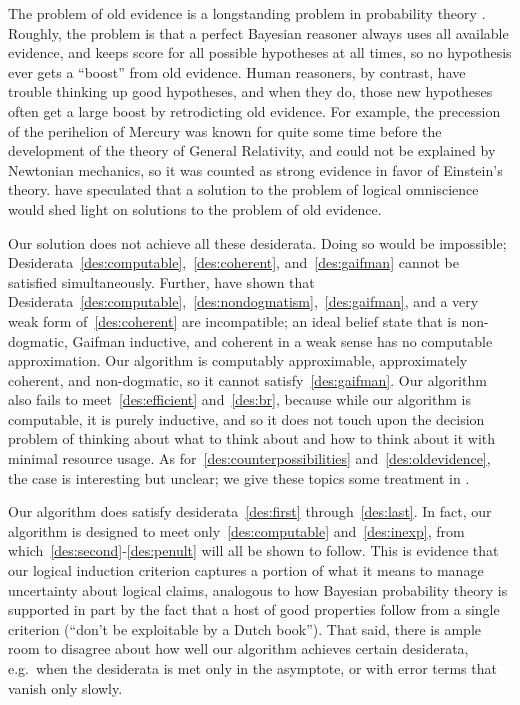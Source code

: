 \documentclass[authordate,onecolumn,noenvironments]{miri-tech-article}
\numberwithin{equation}{subsection}
\begin{document}
\noindent The problem of old evidence is a longstanding problem in probability theory \citep{Glymour:1980:OldEvidence}. Roughly, the problem is that a perfect Bayesian reasoner always uses all available evidence, and keeps score for all possible hypotheses at all times, so no hypothesis ever gets a ``boost'' from old evidence. Human reasoners, by contrast, have trouble thinking up good hypotheses, and when they do, those new hypotheses often get a large boost by retrodicting old evidence. For example, the precession of the perihelion of Mercury was known for quite some time before the development of the theory of General Relativity, and could not be explained by Newtonian mechanics, so it was counted as strong evidence in favor of Einstein's theory. \citet{Garber:1983:OldEvidence,Jeffrey:1983:OldEvidence} have speculated that a solution to the problem of logical omniscience would shed light on solutions to the problem of old evidence.\par\bigskip

\noindent Our solution does not achieve all these desiderata. Doing so would be impossible; Desiderata~\ref{des:computable},~\ref{des:coherent}, and~\ref{des:gaifman} cannot be satisfied simultaneously. Further, \citet{Sawin:2013:pi1pi2} have shown that Desiderata~\ref{des:computable},~\ref{des:nondogmatism},~\ref{des:gaifman}, and a very weak form of~\ref{des:coherent} are incompatible; an ideal belief state that is non-dogmatic, Gaifman inductive, and coherent in a weak sense has no computable approximation. Our algorithm is computably approximable, approximately coherent, and non-dogmatic, so it cannot satisfy~\ref{des:gaifman}. Our algorithm also fails to meet~\ref{des:efficient} and~\ref{des:br}, because while our algorithm is computable, it is purely inductive, and so it does not touch upon the decision problem of thinking about what to think about and how to think about it with minimal resource usage. As for~\ref{des:counterpossibilities} and~\ref{des:oldevidence}, the case is interesting but unclear; we give these topics some treatment in .

Our algorithm does satisfy desiderata~\ref{des:first} through~\ref{des:last}. In fact, our algorithm is designed to meet only~\ref{des:computable} and~\ref{des:inexp}, from which~\ref{des:second}-\ref{des:penult} will all be shown to  follow. This is evidence that our logical induction criterion captures a portion of what it means to manage uncertainty about logical claims, analogous to how Bayesian probability theory is supported in part by the fact that a host of good properties follow from a single criterion (``don't be exploitable by a Dutch book''). That said, there is ample room to disagree about how well our algorithm achieves certain desiderata, e.g.\ when the desiderata is met only in the asymptote, or with error terms that vanish only slowly.
\end{document}
